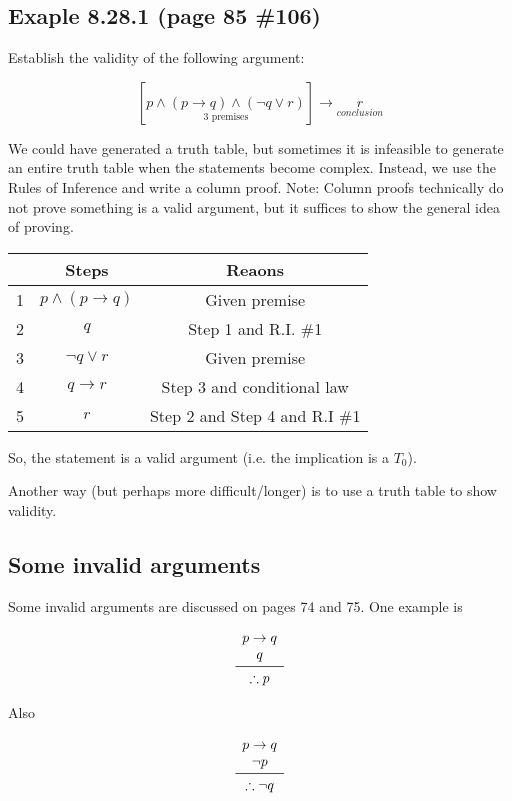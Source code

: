 \documentclass{article}
\begin{document}
\subsection*{Exaple 8.28.1 (page 85 \#106)}

Establish the validity of the following argument:

\[
\left\lbrack \underset{3\text{ premises}}{p\wedge\left(p\rightarrow q\right)\wedge (\neg q\vee r)}\right\rbrack \rightarrow \underset{conclusion}{r}
\]

We could have generated a truth table, but sometimes it is infeasible
to generate an entire truth table when the statements become
complex. Instead, we use the Rules of Inference and write a column
proof. Note: Column proofs technically do not prove something is a
valid argument, but it suffices to show the general idea of proving.

\begin{tabular}{c|c|c}
  & Steps & Reaons \\
\hline
1 & $p\wedge(p\rightarrow{}q)$ & Given premise \\
2 & $q$ & Step 1 and R.I. \#1 \\
3 & $\neg{}q\vee{}r$ & Given premise \\
4 & $q\rightarrow{}r$ & Step 3 and conditional law \\
5 & $r$ & Step 2 and Step 4 and R.I \#1 \\
\end{tabular}

So, the statement is a valid argument (i.e. the implication is a
$T_0$).

Another way (but perhaps more difficult/longer) is to use a truth
table to show validity.

\subsection*{Some invalid arguments}

Some invalid arguments are discussed on pages 74 and 75. One example is

\[
\begin{array}{c}
p\rightarrow q \\
q \\
\midrule
\therefore p \\
\end{array}
\]

Also

\[
\begin{array}{c}
p\rightarrow q \\
\neg p \\
\midrule
\therefore \neg q \\
\end{array}
\]
\end{document}
